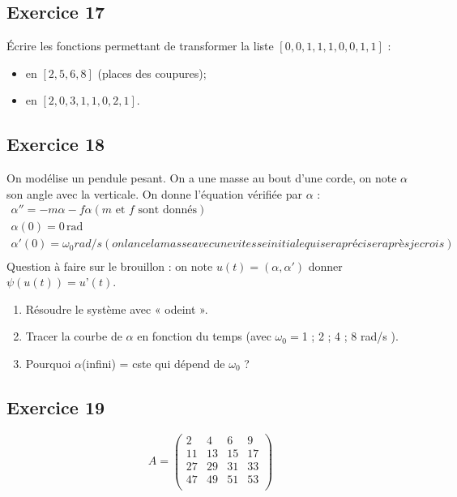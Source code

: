 \documentclass[10pt,fleqn]{article} %
\begin{document}
\begin{multicols}{2}
\subsection*{Exercice 17}
Écrire les fonctions permettant de transformer la liste $[0,0,1,1,1,0,0,1,1]$ :
\begin{itemize}
\item en $[2,5,6,8]$ (places des coupures);
\item en $[2,0,3,1,1,0,2,1]$.
\end{itemize}

\subsection*{Exercice 18}

On modélise un pendule pesant. On a une masse au bout d’une corde, on note $\alpha$ son angle avec la verticale.
On donne l’équation vérifiée par $\alpha$ :
$$\begin{array}{c}
\alpha '' = - m \alpha  - f \alpha   (m \text{ et } f \text{ sont donnés}) \\
\alpha (0) = 0 \, \text{rad} \\
\alpha'(0) = \omega_0 rad / s (on lance la masse avec une vitesse initiale qui sera préciser après je crois)\\
\end{array}
$$
Question à faire sur le brouillon : 
on note $u(t) = (\alpha, \alpha')$ donner $\psi(u(t)) = u’(t)$.

\begin{enumerate}
\item Résoudre le système avec « odeint ».

\item Tracer la courbe de $\alpha$ en fonction du temps (avec $\omega_0 =$1 ; 2 ; 4 ; 8 rad/s ).

\item Pourquoi $\alpha$(infini) = cste qui dépend de $\omega_0$ ?
\end{enumerate}

\subsection*{Exercice 19}
$$ A= \begin{pmatrix}
2 & 4 & 6 & 9 \\
11 & 13 & 15 & 17 \\
27 & 29 & 31 & 33 \\
47 & 49 & 51 & 53 \\
\end{pmatrix}$$


\end{multicols}
\end{document}
